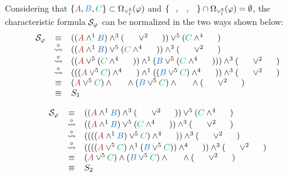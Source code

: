 \begin{example}
\noindent
Considering that $\{ \hA{A}, \hB{B}, \hE{C}\} \subset \occInference{\varphi}{\vee_l^5}$ and $\{ \hD{A}, \hC{B}, \hF{C} \} \cap \occInference{\varphi}{\vee_l^5} = \emptyset$, the characteristic formula $\mathcal{S}_{\varphi}$ can be normalized in the two ways shown below:
$$
\begin{array}{rcl}
\struct{\varphi} 
& \equiv &
((\hA{A} \structplus^1 \hB{B}) \structplus^3 (\hC{\structdual{B}} \structtimes^2 \hD{\structdual{A}}))
\structtimes^5
(\hE{C} \structplus^4 \hF{\structdual{C}}) \\
%
& \normalizePlusTimesS &
	((\hA{A} \structplus^1 \hB{B})\structtimes^5 (\hE{C} \structplus^4 \hF{\structdual{C}}))
\structplus^3 
	(\hC{\structdual{B}} \structtimes^2 \hD{\structdual{A}}) \\
%
& \normalizePlusTimesS &
((\hA{A} \structtimes^5
(\hE{C} \structplus^4 \hF{\structdual{C}})) \structplus^1 (\hB{B}\structtimes^5
(\hE{C} \structplus^4 \hF{\structdual{C}}))) \structplus^3 (\hC{\structdual{B}} \structtimes^2 \hD{\structdual{A}}) \\
%
& \normalizePlusTimesS &
(
		(
			(
				\hA{A} 
			\structtimes^5 
				\hE{C}
			) 
		\structplus^4 
			\hF{\structdual{C}}
		) 
	\structplus^1 
		(
			(
				\hB{B}
			\structtimes^5 
				\hE{C}
			) 
		\structplus^4 
			\hF{\structdual{C}}
		)
) 
\structplus^3 
(
	\hC{\structdual{B}} \structtimes^2 \hD{\structdual{A}}
) \\
& \equiv &	
	(
		\hA{A} 
	\structtimes^5 
		\hE{C}
	) 
\structplus 
	\hF{\structdual{C}}	 
\structplus 	
	(
		\hB{B}
	\structtimes^5 
		\hE{C}
	) 
\structplus 
	\hF{\structdual{C}}
\structplus 
(
	\hC{\structdual{B}} \structtimes^2 \hD{\structdual{A}}
) \\
& \equiv & S_1
\end{array}
$$

$$
\begin{array}{rcl}
\struct{\varphi} 
& \equiv &
((\hA{A} \structplus^1 \hB{B}) \structplus^3 (\hC{\structdual{B}} \structtimes^2 \hD{\structdual{A}}))
\structtimes^5
(\hE{C} \structplus^4 \hF{\structdual{C}}) \\
%
& \normalizePlusTimesS &
	((\hA{A} \structplus^1 \hB{B})\structtimes^5 (\hE{C} \structplus^4 \hF{\structdual{C}}))
\structplus^3 
	(\hC{\structdual{B}} \structtimes^2 \hD{\structdual{A}}) \\
%
& \normalizePlusTimesS &
	((((\hA{A} \structplus^1 \hB{B})\structtimes^5 \hE{C}) \structplus^4 \hF{\structdual{C}}))
\structplus^3 
	(\hC{\structdual{B}} \structtimes^2 \hD{\structdual{A}}) \\
%
%
& \normalizePlusTimesS &
	((((\hA{A}\structtimes^5 \hE{C}) \structplus^1 (\hB{B}\structtimes^5 \hE{C})) \structplus^4 \hF{\structdual{C}}))
\structplus^3 
	(\hC{\structdual{B}} \structtimes^2 \hD{\structdual{A}}) \\
%
& \equiv &
	(\hA{A}\structtimes^5 \hE{C}) \structplus (\hB{B}\structtimes^5 \hE{C}) \structplus \hF{\structdual{C}}
\structplus 
	(\hC{\structdual{B}} \structtimes^2 \hD{\structdual{A}}) \\
%
& \equiv &
	S_2 \\
\end{array}
$$


\end{example}
